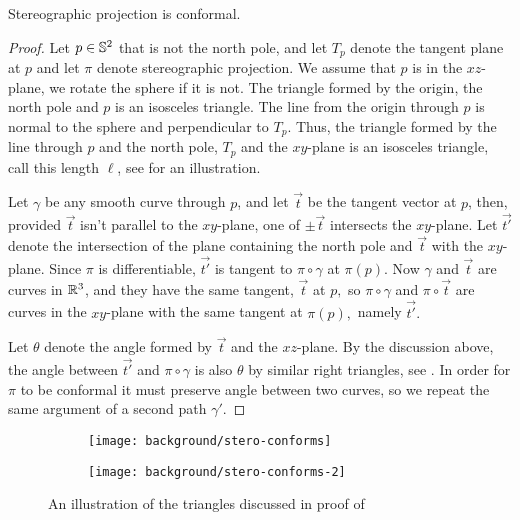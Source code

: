 \begin{theorem}\label{thm:stereo-confroms}
Stereographic projection is conformal.
\end{theorem}
\begin{proof}
	Let $p\in\mathbb{S}^2$ that is not the north pole, and let $T_p$ denote the tangent
	plane at $p$ and let $\pi$ denote stereographic projection.
	 We assume that $p$ is in the $xz$-plane, we rotate the sphere if it is not.
	The triangle formed by the origin, the north pole and $p$
	is an isosceles triangle. 
	The line from the origin through $p$ is normal to the sphere and perpendicular
	to $T_p$. Thus, the triangle formed by the line through $p$ and the north pole,
	$T_p$ and the $xy$-plane is an isosceles triangle, call this length $\ell$, 
	see  for an illustration.
	
	Let $\gamma$ be any smooth curve through $p$, and let $\vec{t}$ be the tangent vector at $p$, then,
	 provided $\vec{t}$ isn't parallel to the $xy$-plane, one of $\pm \vec{t}$
	intersects the $xy$-plane. Let $\vec{t'}$ denote the intersection of the plane containing the north
	pole and $\vec{t}$ with the $xy$-plane. Since $\pi$ is differentiable, $\vec{t'}$ is tangent to $\pi \circ \gamma$ at $\pi(p)$. 
	Now $\gamma$ and $\vec{t}$ are curves in $\mathbb{R}^3$, and they have the same tangent, $\vec{t}$
	at $p,$ so $\pi\circ \gamma$ and $\pi \circ \vec{t}$ are curves in the $xy$-plane with the same
	tangent at $\pi(p),$ namely $\vec{t'}.$
	
	Let $\theta$ denote the angle formed by $\vec{t}$ and the $xz$-plane. 
	By the discussion
	above, the angle between $\vec{t'}$ and $\pi \circ \gamma$ is also $\theta$ by similar right triangles,
	see .
	In order for $\pi$ to be conformal it must preserve angle between two curves, so we repeat 
	the same argument of a second path $\gamma'$.
	
	
\end{proof}

 \begin{figure}[htb]
         \centering
        \begin{subfigure}[b]{0.4\textwidth}
         \texttt{[image: background/stero-conforms]}
         \caption{}
 	 \label{fig:conforms}
       \end{subfigure}
         \hspace{1cm}
         \begin{subfigure}[b]{0.3\textwidth}
         \texttt{[image: background/stero-conforms-2]}
         \caption{}
          \label{fig:project-tangent}
         \end{subfigure}
		\caption{An illustration of the triangles discussed in proof of 
 		\label{fig:conformal}}
 \end{figure}



